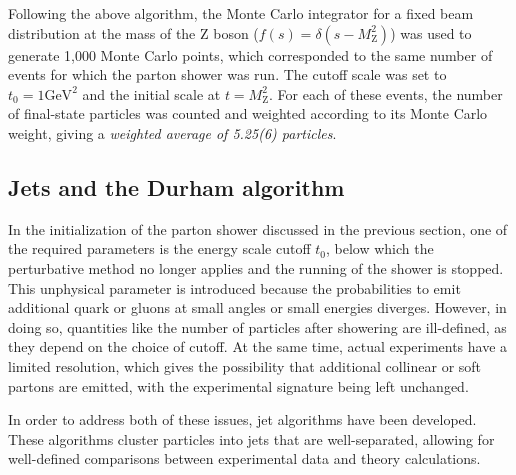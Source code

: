 Following the above algorithm, the Monte Carlo integrator for a fixed beam distribution at the mass of the Z boson ($f(s) = \delta(s - M_{\mathrm{Z}}^{2})$) was used to generate 1,000 Monte Carlo points, which corresponded to the same number of events for which the parton shower was run. The cutoff scale was set to $t_{0} = 1 \text{GeV}^{2}$ and the initial scale at $t = M_{\mathrm{Z}}^{2}$. For each of these events, the number of final-state particles was counted and weighted according to its Monte Carlo weight, giving a \emph{weighted average of 5.25(6) particles}.

\subsection{Jets and the Durham algorithm}

In the initialization of the parton shower discussed in the previous section, one of the required parameters is the energy scale cutoff $t_{0}$, below which the perturbative method no longer applies and the running of the shower is stopped. This unphysical parameter is introduced because the probabilities to emit additional quark or gluons at small angles or small energies diverges. However, in doing so, quantities like the number of particles after showering are ill-defined, as they depend on the choice of cutoff. At the same time, actual experiments have a limited resolution, which gives the possibility that additional collinear or soft partons are emitted, with the experimental signature being left unchanged.

In order to address both of these issues, jet algorithms have been developed. These algorithms cluster particles into jets that are well-separated, allowing for well-defined comparisons between experimental data and theory calculations.

